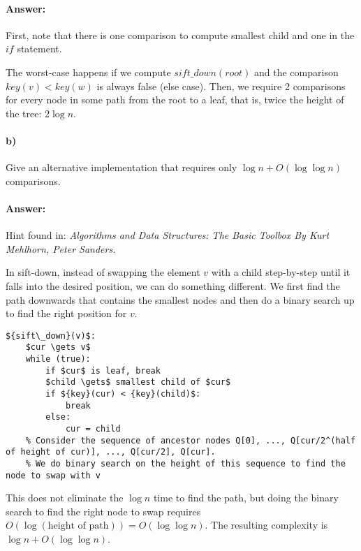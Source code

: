 \documentclass[a4paper]{article}
\begin{document}
\paragraph{Answer:} First, note that there is one comparison to compute smallest child and one in the ${if}$ statement.
 
The worst-case happens if we compute ${sift\_down}({root})$ and the comparison ${key}(v) < {key}(w)$ is always false (else case). Then, we require 2 comparisons for every node in some path from the root to a leaf, that is, twice the height of the tree:  $2 \log n$.

\paragraph{b) } Give an alternative implementation that requires only $\log n + O(\log \log n)$ comparisons.

\paragraph{Answer:}

Hint found in: \emph{Algorithms and Data Structures: The Basic Toolbox By Kurt Mehlhorn, Peter Sanders.}

In sift-down, instead of swapping the element $v$ with a child step-by-step until it falls into the desired position, we can do something different. We first find the path downwards that contains the smallest nodes and then do a binary search up to find the right position for $v$.

\begin{lstlisting}[mathescape]
${sift\_down}(v)$:
    $cur \gets v$
    while (true):
        if $cur$ is leaf, break
        $child \gets$ smallest child of $cur$
        if ${key}(cur) < {key}(child)$:
            break
        else:
            cur = child
    % Consider the sequence of ancestor nodes Q[0], ..., Q[cur/2^(half of height of cur)], ..., Q[cur/2], Q[cur].
    % We do binary search on the height of this sequence to find the node to swap with v
\end{lstlisting}

This does not eliminate the $\log n$ time to find the path, but doing the binary search to find the right node to swap requires $O(\log (\text{height of path})) = O(\log \log n)$. The resulting complexity is $\log n + O(\log\log n)$.
\end{document}
